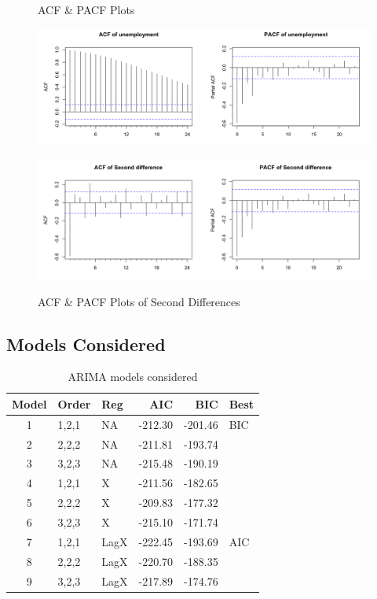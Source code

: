 \documentclass[twoside,twocolumn]{article}
\begin{document}
    \begin{figure}[H]
    	\centering
     	\caption{ACF \& PACF Plots}
     	\includegraphics[width=\linewidth]{images/acfpacf}
     	\label{fig:acfpacf}
     	\caption{ACF \& PACF Plots of Second Differences}
     	\includegraphics[width=\linewidth]{images/acfpacf2d}
     	\label{fig:acfpacf2}
      \end{figure}


\subsection{Models Considered}

\begin{table}[ht]
\centering
\caption{ARIMA models considered}
\label{tab:arimachoices}
\begin{tabular}{cllrrl}
  \hline
 Model & Order & Reg  & AIC & BIC & Best \\ 
  \hline
1 & 1,2,1 &  NA &   -212.30 & -201.46 & BIC \\ 
  2  & 2,2,2 & NA   & -211.81 & -193.74 &  \\ 
  3  & 3,2,3 &  NA  & -215.48 & -190.19 &  \\ 
  4  & 1,2,1 & X  & -211.56 & -182.65 &  \\ 
  5  & 2,2,2 & X   & -209.83 & -177.32 &  \\ 
  6  & 3,2,3 & X   & -215.10 & -171.74 &  \\ 
  7  & 1,2,1 &  LagX & -222.45 & -193.69 & AIC \\ 
  8  & 2,2,2 &  LagX & -220.70 & -188.35 &  \\ 
  9  & 3,2,3 &  LagX & -217.89 & -174.76 &  \\ 
   \hline
\end{tabular}
\end{table}
\end{document}

